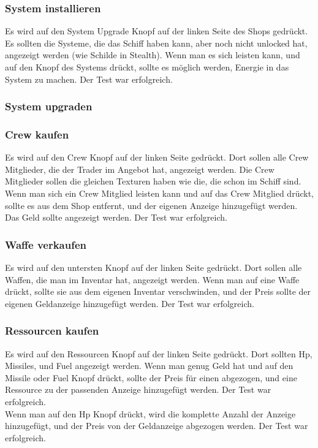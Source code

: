 \documentclass[fontsize=12pt,paper=a4,twoside]{scrartcl}
\begin{document}
\subsubsection{System installieren}
Es wird auf den System Upgrade Knopf auf der linken Seite des Shops gedrückt. Es sollten die Systeme, die das Schiff haben kann, aber noch nicht unlocked hat, angezeigt werden (wie Schilde in Stealth). Wenn man es sich leisten kann, und auf den Knopf des Systems drückt, sollte es möglich werden, Energie in das System zu machen.  Der Test war erfolgreich. \\ 
\subsubsection{System upgraden}
\subsubsection{Crew kaufen}
Es wird auf den Crew Knopf auf der linken Seite gedrückt. Dort sollen alle Crew Mitglieder, die der Trader im Angebot hat, angezeigt werden. Die Crew Mitglieder sollen die gleichen Texturen haben wie die, die schon im Schiff sind. Wenn man sich ein Crew Mitglied leisten kann und auf das Crew Mitglied drückt, sollte es aus dem Shop entfernt, und der eigenen Anzeige hinzugefügt werden. Das Geld sollte angezeigt werden.  Der Test war erfolgreich. \\
\subsubsection{Waffe verkaufen}
Es wird auf den untersten Knopf auf der linken Seite gedrückt. Dort sollen alle Waffen, die man im Inventar hat, angezeigt werden. Wenn man auf eine Waffe drückt, sollte sie aus dem eigenen Inventar verschwinden, und der Preis sollte der eigenen Geldanzeige hinzugefügt werden.  Der Test war erfolgreich. \\
\subsubsection{Ressourcen kaufen}
Es wird auf den Ressourcen Knopf auf der linken Seite gedrückt. Dort sollten Hp, Missiles, und Fuel angezeigt werden. Wenn man genug Geld hat und auf den Missile oder Fuel Knopf drückt, sollte der Preis für einen abgezogen, und eine Ressource zu der passenden Anzeige hinzugefügt werden.  Der Test war erfolgreich. \\
Wenn man auf den Hp Knopf drückt, wird die komplette Anzahl der Anzeige hinzugefügt, und der Preis von der Geldanzeige abgezogen werden.  Der Test war erfolgreich. \\
\end{document}
